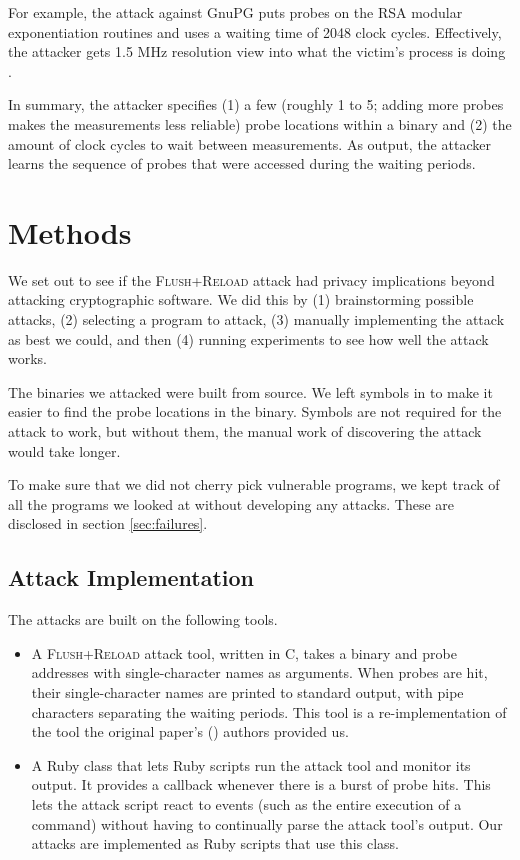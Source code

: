 \documentclass{acm_proc_article-sp}
\begin{document}
For example, the attack against GnuPG puts probes on the RSA modular
exponentiation routines and uses a waiting time of 2048 clock cycles.
Effectively, the attacker gets 1.5 MHz resolution view into what the victim's
process is doing \cite{yarom2013flush}.

In summary, the attacker specifies (1) a few (roughly 1 to 5; adding more probes
makes the measurements less reliable) probe locations within a binary and (2)
the amount of clock cycles to wait between measurements. As output, the attacker
learns the sequence of probes that were accessed during the waiting periods.

\section{Methods}
\label{sec:methods}

We set out to see if the \textsc{Flush+Reload} attack had privacy implications beyond
attacking cryptographic software. We did this by (1) brainstorming possible
attacks, (2) selecting a program to attack, (3) manually implementing the attack
as best we could, and then (4) running experiments to see how well the attack
works.

The binaries we attacked were built from source. We left symbols in to make it
easier to find the probe locations in the binary. Symbols are not required for
the attack to work, but without them, the manual work of discovering the attack
would take longer.

To make sure that we did not cherry pick vulnerable programs, we kept track of
all the programs we looked at without developing any attacks. These are
disclosed in section \ref{sec:failures}.

\subsection{Attack Implementation}

The attacks are built on the following tools.

\begin{itemize}
    \item A \textsc{Flush+Reload} attack tool, written in C, takes a binary and probe
        addresses with single-character names as arguments. When probes are hit,
        their single-character names are printed to standard output, with pipe
        characters separating the waiting periods. This tool is
        a re-implementation of the tool the original paper's
        (\cite{yarom2013flush}) authors provided us.

    \item A Ruby class that lets Ruby scripts run the attack tool and monitor
        its output. It provides a callback whenever there is a burst of probe
        hits. This lets the attack script react to events (such as the entire
        execution of a command) without having to continually parse the attack
        tool's output. Our attacks are implemented as Ruby scripts that use this
        class.
\end{itemize}
\end{document}
